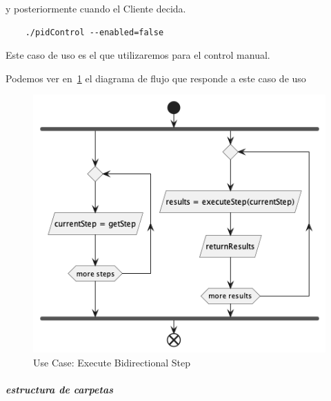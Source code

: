 y posteriormente cuando el Cliente decida.

\begin{verbatim}
    ./pidControl --enabled=false
\end{verbatim}

Este caso de uso es el que utilizaremos para el control manual.

Podemos ver en~\ref{fig:Use Case-Execute Bidirectional Step} el diagrama de flujo que responde a este caso de uso

\begin{figure}[H]
    \centering
    \includegraphics[height=0.2\textheight]{./part/Proyecto_ejecutivo/memoria_descriptiva/descripcionDelProyecto/client/uml/executeBidiStep}
    \caption{Use Case: Execute Bidirectional Step}\label{fig:Use Case-Execute Bidirectional Step}
\end{figure}

\subparagraph{estructura de carpetas}







